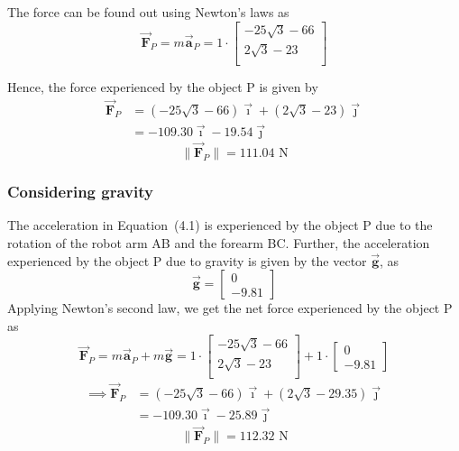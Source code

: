 The force can be found out using Newton's laws as
\begin{equation*}
    \vec{\mathbf{F}}_P
    =
    m \vec{\mathbf{a}}_P = 1 \cdot
    \begin{bmatrix}
        - 25\sqrt{3} - 66 \\
        2\sqrt{3} - 23    \\
    \end{bmatrix}
\end{equation*}

Hence, the force experienced by the object P is given by
\begin{align*}
    \vec{\mathbf{F}}_P
     & =
    \boxed{
        (- 25\sqrt{3} - 66) \vec{\mathbf{\imath}} + (2\sqrt{3} - 23) \vec{\mathbf{\jmath}}
    }
    \\ & =
    \boxed{
        -109.30 \vec{\mathbf{\imath}} -19.54 \vec{\mathbf{\jmath}}
    }
\end{align*}
\begin{equation*}
    \boxed{
        \lVert \vec{\mathbf{F}}_P \rVert = 111.04 \text{ N}
    }
\end{equation*}

\subsubsection*{Considering gravity}

The acceleration in Equation~(4.1) is experienced by the object P due to the rotation of the robot arm AB and the forearm BC.\@
Further, the acceleration experienced by the object P due to gravity is given by the vector \(\vec{\mathbf{g}}\), as
\[
    \vec{\mathbf{g}} = \begin{bmatrix} 0 \\ -9.81 \end{bmatrix}
\]
Applying Newton's second law, we get the net force experienced by the object P as
\begin{equation*}
    \vec{\mathbf{F}}_P = m \vec{\mathbf{a}}_P + m \vec{\mathbf{g}} =
    1 \cdot
    \begin{bmatrix}
        - 25\sqrt{3} - 66 \\
        2\sqrt{3} - 23    \\
    \end{bmatrix}
    +
    1 \cdot
    \begin{bmatrix}
        0 \\ -9.81
    \end{bmatrix}
\end{equation*}
\begin{align*}
    \implies
    \vec{\mathbf{F}}_P
     & =
    \boxed{
        (- 25\sqrt{3} - 66) \vec{\mathbf{\imath}} + (2\sqrt{3} - 29.35) \vec{\mathbf{\jmath}}
    }
    \\ & =
    \boxed{
        -109.30 \vec{\mathbf{\imath}} -25.89 \vec{\mathbf{\jmath}}
    }
\end{align*}
\begin{equation*}
    \boxed{
        \lVert \vec{\mathbf{F}}_P \rVert = 112.32 \text{ N}
    }
\end{equation*}

